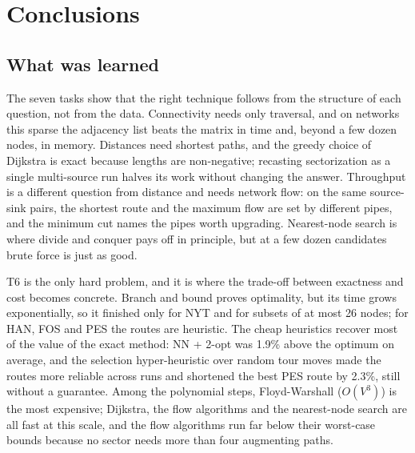 \section{Conclusions}\label{sec:conclusions}

\subsection{What was learned}
The seven tasks show that the right technique follows from the structure of each question, not from the data. Connectivity needs only traversal, and on networks this sparse the adjacency list beats the matrix in time and, beyond a few dozen nodes, in memory. Distances need shortest paths, and the greedy choice of Dijkstra is exact because lengths are non-negative; recasting sectorization as a single multi-source run halves its work without changing the answer. Throughput is a different question from distance and needs network flow: on the same source-sink pairs, the shortest route and the maximum flow are set by different pipes, and the minimum cut names the pipes worth upgrading. Nearest-node search is where divide and conquer pays off in principle, but at a few dozen candidates brute force is just as good.

T6 is the only hard problem, and it is where the trade-off between exactness and cost becomes concrete. Branch and bound proves optimality, but its time grows exponentially, so it finished only for NYT and for subsets of at most 26 nodes; for HAN, FOS and PES the routes are heuristic. The cheap heuristics recover most of the value of the exact method: NN + 2-opt was 1.9\% above the optimum on average, and the selection hyper-heuristic over random tour moves made the routes more reliable across runs and shortened the best PES route by 2.3\%, still without a guarantee. Among the polynomial steps, Floyd-Warshall ($O(V^3)$) is the most expensive; Dijkstra, the flow algorithms and the nearest-node search are all fast at this scale, and the flow algorithms run far below their worst-case bounds because no sector needs more than four augmenting paths.

